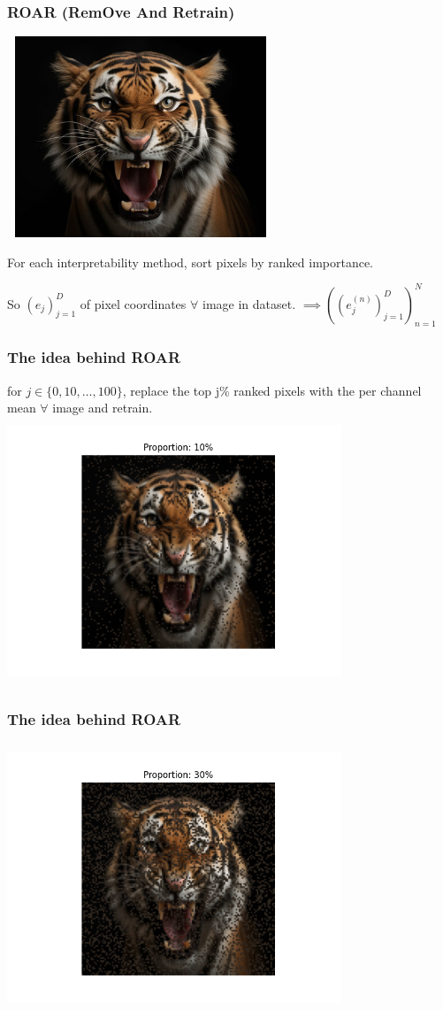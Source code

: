 \documentclass{beamer}
\theoremstyle{mystyle}
\begin{document}
\begin{frame}
	\frametitle{ROAR (RemOve And Retrain)}
	\includegraphics[height=6cm, width=8cm]{tiger.png}

	For each interpretability method, sort pixels by ranked importance. \\ \pause 
	

	So $(e_j)_{j=1}^{D}$ of pixel coordinates $\forall $ image in dataset. $\implies ( (e_j^{(n)})_{j=1}^D )_{n=1}^N $
\end{frame}
\begin{frame}
	\frametitle{The idea behind ROAR}

	for $j \in \{0, 10, \ldots,100\} $, replace the top j\% ranked pixels with the per channel mean  $\forall $ image and retrain.
	\includegraphics[height=8cm, width=10cm]{tiger0.1.png}

\end{frame}
\begin{frame}
	\frametitle{The idea behind ROAR}
	\includegraphics[height=8cm, width=10cm]{tiger0.3.png}

\end{frame}
\end{document}

